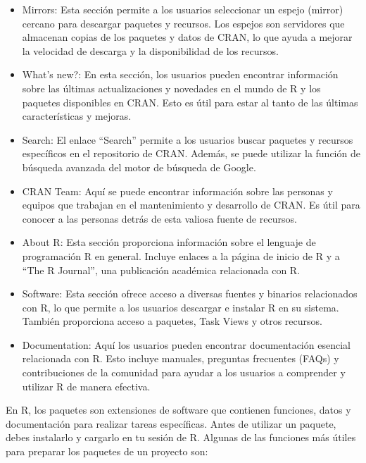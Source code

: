 \documentclass[12pt]{report}\usepackage[]{graphicx}\usepackage[dvipsnames]{xcolor}
\begin{document}
			\begin{itemize}
				\item Mirrors: Esta sección permite a los usuarios seleccionar un espejo (mirror) cercano para descargar paquetes y recursos. Los espejos son servidores que almacenan copias de los paquetes y datos de CRAN, lo que ayuda a mejorar la velocidad de descarga y la disponibilidad de los recursos.
				
				\item What's new?: En esta sección, los usuarios pueden encontrar información sobre las últimas actualizaciones y novedades en el mundo de R y los paquetes disponibles en CRAN. Esto es útil para estar al tanto de las últimas características y mejoras.
				
				\item Search: El enlace ``Search'' permite a los usuarios buscar paquetes y recursos específicos en el repositorio de CRAN. Además, se puede utilizar la función de búsqueda avanzada del motor de búsqueda de Google.
				
				\item CRAN Team: Aquí se puede encontrar información sobre las personas y equipos que trabajan en el mantenimiento y desarrollo de CRAN. Es útil para conocer a las personas detrás de esta valiosa fuente de recursos.
				
				\item About R: Esta sección proporciona información sobre el lenguaje de programación R en general. Incluye enlaces a la página de inicio de R y a ``The R Journal'', una publicación académica relacionada con R.
				
				\item Software: Esta sección ofrece acceso a diversas fuentes y binarios relacionados con R, lo que permite a los usuarios descargar e instalar R en su sistema. También proporciona acceso a paquetes, Task Views y otros recursos.
				
				\item Documentation: Aquí los usuarios pueden encontrar documentación esencial relacionada con R. Esto incluye manuales, preguntas frecuentes (FAQs) y contribuciones de la comunidad para ayudar a los usuarios a comprender y utilizar R de manera efectiva.
			\end{itemize}
			
			En R, los paquetes son extensiones de software que contienen funciones, datos y documentación para realizar tareas específicas. Antes de utilizar un paquete, debes instalarlo y cargarlo en tu sesión de R. Algunas de las funciones más útiles para preparar los paquetes de un proyecto son:
			
\end{document}

